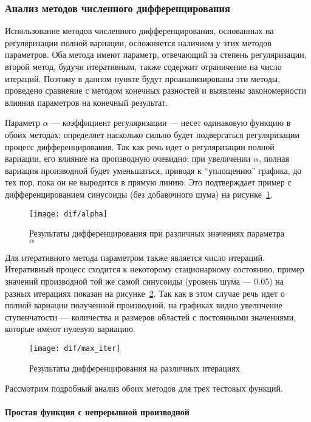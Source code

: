 \subsubsection{Анализ методов численного дифференцирования}

Использование методов численного дифференцирования, основанных на регуляризации полной вариации, осложняется наличием у этих методов параметров. Оба метода имеют параметр, отвечающий за степень регуляризации, второй метод, будучи итеративным, также содержит ограничение на число итераций. Поэтому в данном пункте будут проанализированы эти методы, проведено сравнение с методом конечных разностей и выявлены закономерности влияния параметров на конечный результат.

Параметр $\alpha$ --- коэффициент регуляризации --- несет одинаковую функцию в обоих методах: определяет насколько сильно будет подвергаться регуляризации процесс дифференцирования. Так как речь идет о регуляризации полной вариации, его влияние на производную очевидно: при увеличении $\alpha$, полная вариация производной будет уменьшаться, приводя к \enquote{уплощению} графика, до тех пор, пока он не выродится в прямую линию. Это подтверждает пример с дифференцированием синусоиды (без добавочного шума) на рисунке~\ref{fig:dif:alpha}.

\begin{figure}
\texttt{[image: dif/alpha]}
\caption{Результаты дифференцирования при различных значениях параметра $\alpha$}
\label{fig:dif:alpha}
\end{figure}

Для итеративного метода параметром также является число итераций. Итеративный процесс сходится к некоторому стационарному состоянию, пример значений производной той же самой синусоиды (уровень шума --- $0.05$) на разных итерациях показан на рисунке~\ref{fig:dif:max_iter}. Так как в этом случае речь идет о полной вариации полученной производной, на графиках видно увеличение ступенчатости --- количества и размеров областей с постоянными значениями, которые имеют нулевую вариацию.

\begin{figure}
\texttt{[image: dif/max\_iter]}
\caption{Результаты дифференцирования на различных итерациях}
\label{fig:dif:max_iter}
\end{figure}

Рассмотрим подробный анализ обоих методов для трех тестовых функций.

\paragraph{Простая функция с непрерывной производной}

